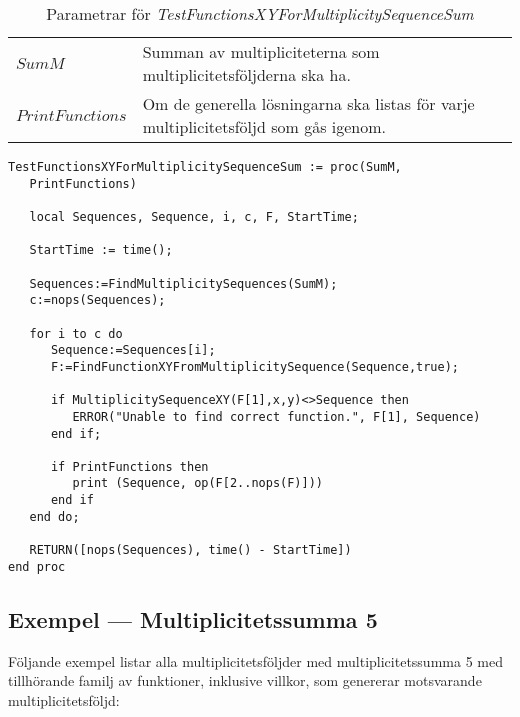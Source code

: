 \begin{table}[h]
\caption{Parametrar för \emph{TestFunctionsXYForMultiplicitySequenceSum}}
\begin{center}
\begin{tabular}{|l|p{9cm}|}
\hline
$SumM$ & Summan av multipliciteterna som multiplicitetsföljderna ska ha.\\
$PrintFunctions$ & Om de generella lösningarna ska listas för varje multiplicitetsföljd som gås igenom.\\
\hline
\end{tabular}
\end{center}
\end{table}

\begin{verbatim}
TestFunctionsXYForMultiplicitySequenceSum := proc(SumM,
   PrintFunctions)
   
   local Sequences, Sequence, i, c, F, StartTime;

   StartTime := time();

   Sequences:=FindMultiplicitySequences(SumM);
   c:=nops(Sequences);

   for i to c do
      Sequence:=Sequences[i];
      F:=FindFunctionXYFromMultiplicitySequence(Sequence,true);
      
      if MultiplicitySequenceXY(F[1],x,y)<>Sequence then
         ERROR("Unable to find correct function.", F[1], Sequence)
      end if;

      if PrintFunctions then
         print (Sequence, op(F[2..nops(F)]))
      end if
   end do;

   RETURN([nops(Sequences), time() - StartTime])
end proc
\end{verbatim}

\subsection{Exempel --- Multiplicitetssumma 5}

Följande exempel listar alla multiplicitetsföljder med multiplicitetssumma 5 med tillhörande familj av funktioner, inklusive villkor, som genererar motsvarande multiplicitetsföljd:

